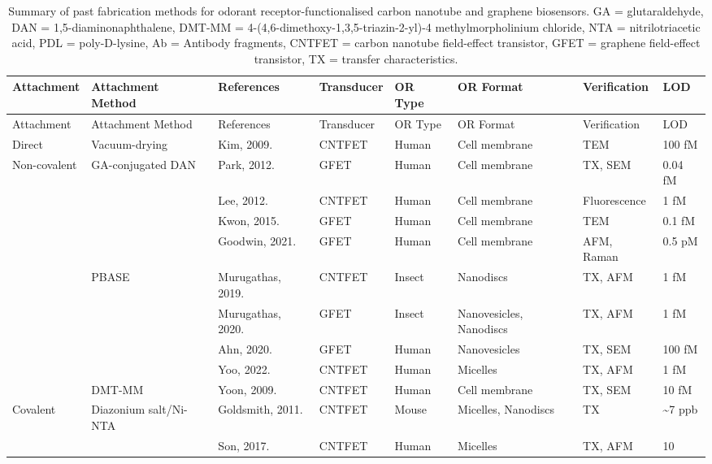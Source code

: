 \documentclass[
  a4paper,
]{scrbook}
\begin{document}
\hypertarget{tbl-or-biosensors}{}
\begin{longtable}[]{@{}llllllll@{}}
\caption{\label{tbl-or-biosensors}Summary of past fabrication methods
for odorant receptor-functionalised carbon nanotube and graphene
biosensors. GA = glutaraldehyde, DAN = 1,5-diaminonaphthalene, DMT-MM =
4-(4,6-dimethoxy-1,3,5-triazin-2-yl)-4 methylmorpholinium chloride, NTA
= nitrilotriacetic acid, PDL = poly-D-lysine, Ab = Antibody fragments,
CNTFET = carbon nanotube field-effect transistor, GFET = graphene
field-effect transistor, TX = transfer characteristics.}\tabularnewline
\toprule\noalign{}
Attachment & Attachment Method & References & Transducer & OR Type & OR
Format & Verification & LOD \\
\midrule\noalign{}
\endfirsthead
\toprule\noalign{}
Attachment & Attachment Method & References & Transducer & OR Type & OR
Format & Verification & LOD \\
\midrule\noalign{}
\endhead
\bottomrule\noalign{}
\endlastfoot
Direct & Vacuum-drying & Kim, 2009. \cite{Kim2009a} & CNTFET & Human &
Cell membrane & TEM & 100 fM \\
Non-covalent & GA-conjugated DAN & Park, 2012. \cite{Park2012} & GFET &
Human & Cell membrane & TX, SEM & 0.04 fM \\
& & Lee, 2012. \cite{Lee2012b} & CNTFET & Human & Cell membrane &
Fluorescence & 1 fM \\
& & Kwon, 2015. \cite{Kwon2015} & GFET & Human & Cell membrane & TEM &
0.1 fM \\
& & Goodwin, 2021. \cite{Goodwin2021} & GFET & Human & Cell membrane &
AFM, Raman & 0.5 pM \\
& PBASE & Murugathas, 2019. \cite{Murugathas2019a} & CNTFET & Insect &
Nanodiscs & TX, AFM & 1 fM \\
& & Murugathas, 2020. \cite{Murugathas2020} & GFET & Insect &
Nanovesicles, Nanodiscs & TX, AFM & 1 fM \\
& & Ahn, 2020. \cite{Ahn2020} & GFET & Human & Nanovesicles & TX, SEM &
100 fM \\
& & Yoo, 2022. \cite{Yoo2022} & CNTFET & Human & Micelles & TX, AFM & 1
fM \\
& DMT-MM & Yoon, 2009. \cite{Yoon2009} & CNTFET & Human & Cell membrane
& TX, SEM & 10 fM \\
Covalent & Diazonium salt/Ni-NTA & Goldsmith, 2011. \cite{Goldsmith2011}
& CNTFET & Mouse & Micelles, Nanodiscs & TX & \textasciitilde7 ppb \\
& & Son, 2017. \cite{Son2017} & CNTFET & Human & Micelles & TX, AFM & 10

\end{longtable}
\end{document}

